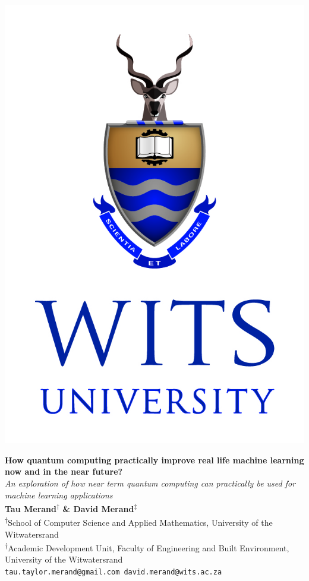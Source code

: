 \documentclass[a0,portrait]{a0poster}
\begin{document}
\begin{minipage}[c]{0.08\linewidth}%
\includegraphics[width=\linewidth]{witslogo}\\%
\end{minipage}%
\begin{minipage}[c]{0.78\linewidth}%
\centering%
\veryHuge \color{NavyBlue} \textbf{How quantum computing practically improve real life  machine learning now and in the near future?}%
 \color{Black}\\[0.3cm]%
\Huge\textit{An exploration of how near term quantum computing can practically be used for machine learning applications}\\[1.2cm]%
\large \textbf{Tau Merand\textsuperscript{$\dagger$} \& David Merand\textsuperscript{$\ddagger$}}\\[0.5cm]%
\normalsize \textsuperscript{$\dagger$}School of Computer Science and Applied Mathematics, University of the Witwatersrand\\%
\textsuperscript{$\dagger$}Academic Development Unit, Faculty of Engineering and Built Environment, University of the Witwatersrand\\%
\texttt{tau.taylor.merand@gmail.com david.merand@wits.ac.za}\\%
\end{minipage}%
\end{document}
